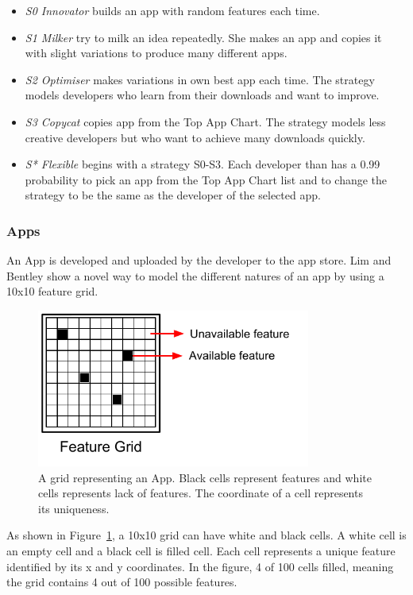 \begin{itemize}
  \item \emph{S0 Innovator} builds an app with random features each time.
  \item \emph{S1 Milker} try to milk an idea repeatedly. She makes an app and copies it with slight variations to produce many different apps.
  \item \emph{S2 Optimiser} makes variations in own best app each time. The strategy models developers who learn from their downloads and want to improve.
  \item \emph{S3 Copycat} copies app from the Top App Chart. The strategy models less creative developers but who want to achieve many downloads quickly.
  \item \emph{S* Flexible} begins with a strategy S0-S3. Each developer than has a 0.99 probability to pick an app from the Top App Chart list and to change the strategy to be the same as the developer of the selected app.
\end{itemize}

\subsubsection*{Apps}
\label{subsubsec:apps}

An App is developed and uploaded by the developer to the app store. Lim and Bentley show a novel way to model the different natures of an app by using a 10x10 feature grid.

\begin{figure}[!htb]
  \centering
  \includegraphics[width=9cm]{figures/example_service_grid.pdf}
  \caption{A grid representing an App. Black cells represent features and white cells represents lack of features. The coordinate of a cell represents its uniqueness.}
  \label{fig:example-grid}
\end{figure}

As shown in Figure~\ref{fig:example-grid}, a 10x10 grid can have white and black cells. A white cell is an empty cell and a black cell is filled cell. Each cell represents a unique feature identified by its x and y coordinates. In the figure, 4 of 100 cells filled, meaning the grid contains 4 out of 100 possible features. 

